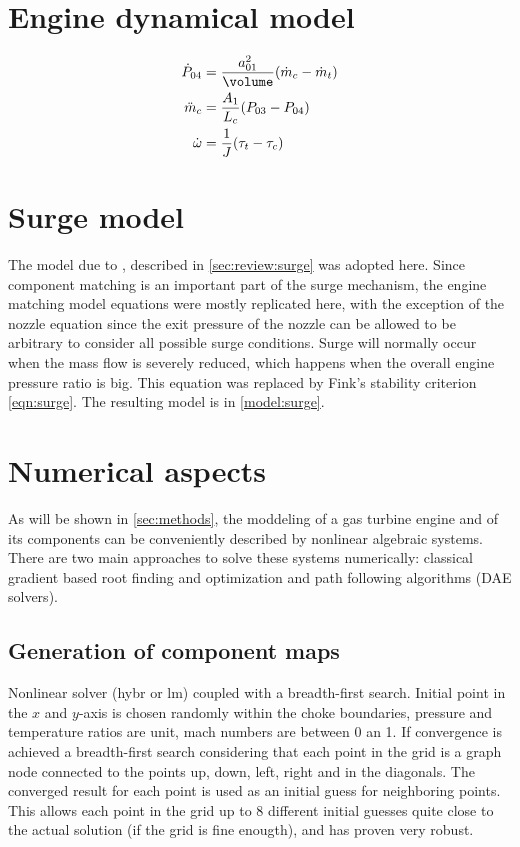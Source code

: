 \documentclass[tcc]{subfiles}
\begin{document}
\section{Engine dynamical model}
\begin{align}
    \dot{P}_{04} &= \frac{a_{01}^2}{\volume}(\dot{m}_c - \dot{m}_t) \\
    \ddot{m}_c &= \frac{A_1}{L_c}(P_{03}-P_{04}) \\
    \dot{\omega} &= \frac{1}{J} (\tau_t-\tau_c)
\end{align}

\section{Surge model}

The model due to \textcite{Finsk}, described in \cref{sec:review:surge} was adopted here. 
Since component matching is an important part of the surge mechanism, the engine matching model equations were mostly replicated here, with the exception of the nozzle equation since the exit pressure of the nozzle can be allowed to be arbitrary to consider all possible surge conditions. Surge will normally occur when the mass flow is severely reduced, which happens when the overall engine pressure ratio is big. This equation was replaced by Fink's stability criterion \cref{eqn:surge}. The resulting model is in \cref{model:surge}.

\section{Numerical aspects}
As will be shown in \cref{sec:methods}, 
the moddeling of a gas turbine engine and of its components can 
be conveniently described by nonlinear algebraic systems. 
There are two main approaches to solve these systems numerically: 
classical gradient based root finding and optimization 
and path following algorithms (\ac{DAE} solvers).

\subsection{Generation of component maps}
Nonlinear solver (hybr or lm) coupled with a breadth-first search. Initial point in the $x$ and $y$-axis is chosen randomly within the choke boundaries, pressure and temperature ratios are unit, mach numbers are between 0 an 1. If convergence is achieved a breadth-first search considering that each point in the grid is a graph node connected to the points up, down, left, right and in the diagonals. The converged result for each point is used as an initial guess for neighboring points. This allows each point in the grid up to 8 different initial guesses quite close to the actual solution (if the grid is fine enougth), and has proven very robust. 
\end{document}
